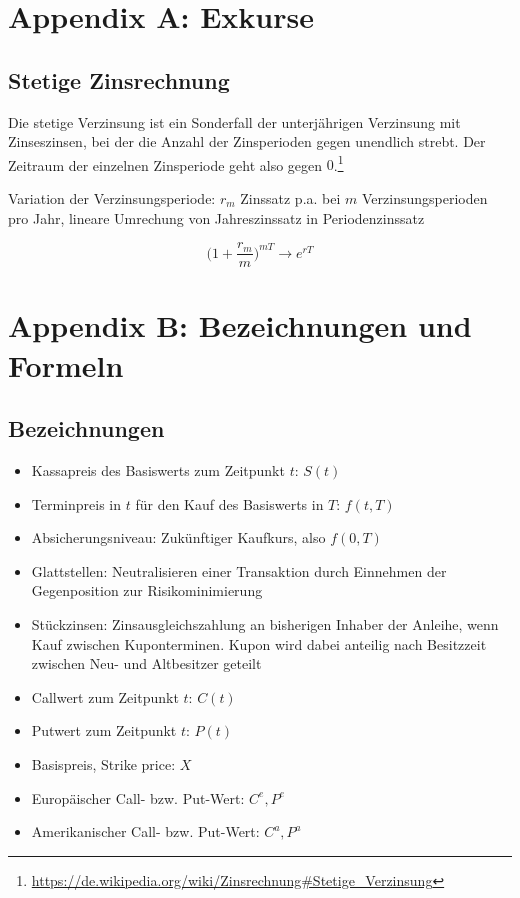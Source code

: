 \section{Appendix A: Exkurse}

\subsection{Stetige Zinsrechnung}

Die stetige Verzinsung ist ein Sonderfall der unterjährigen Verzinsung mit Zinseszinsen, bei der die Anzahl der Zinsperioden gegen unendlich strebt. Der Zeitraum der einzelnen Zinsperiode geht also gegen \(0\).\footnote{\url{https://de.wikipedia.org/wiki/Zinsrechnung\#Stetige_Verzinsung}}

Variation der Verzinsungsperiode: \(r_m\) Zinssatz p.a. bei \(m\) Verzinsungsperioden pro Jahr, lineare Umrechung von Jahreszinssatz in Periodenzinssatz

\[\Big(1+\frac{r_m}{m}\Big)^{mT} \longrightarrow e^{rT}\]


\section{Appendix B: Bezeichnungen und Formeln}

\subsection{Bezeichnungen}
\begin{itemize}
	\item Kassapreis des Basiswerts zum Zeitpunkt \(t\): \(S(t)\)
	\item Terminpreis in \(t\) für den Kauf des Basiswerts in \(T\): \(f(t,T)\)
	\item Absicherungsniveau: Zukünftiger Kaufkurs, also \(f(0,T)\)
	\item Glattstellen: Neutralisieren einer Transaktion durch Einnehmen der Gegenposition zur Risikominimierung
	\item Stückzinsen: Zinsausgleichszahlung an bisherigen Inhaber der Anleihe, wenn Kauf zwischen Kuponterminen. Kupon wird dabei anteilig nach Besitzzeit zwischen Neu- und Altbesitzer geteilt
	\item Callwert zum Zeitpunkt \(t\): \(C(t)\)
	\item Putwert zum Zeitpunkt \(t\): \(P(t)\)
	\item Basispreis, Strike price: \(X\)
	\item Europäischer Call- bzw. Put-Wert: \(C^e, P^e\)
	\item Amerikanischer Call- bzw. Put-Wert: \(C^a, P^a\)
\end{itemize}



